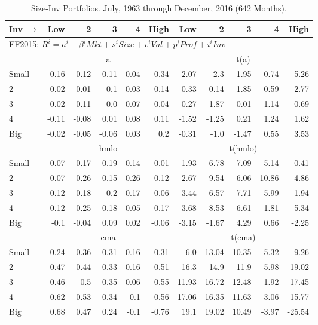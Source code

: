 
\begin{table}[!ht]
\centering
\caption{Size-Inv Portfolios. \footnotesize{July, 1963 through December, 2016 (642 Months).}}
\label{tbl:25_Size_Inv_b}
\begin{tabular}{lrrrrrrrrrr}
  \toprule
  Inv $\rightarrow$ & Low & 2 & 3 & 4 & High & Low & 2 & 3 & 4 & High \\ 
  \toprule
  \multicolumn{9}{l}{FF2015: $R^i=a^i+\beta^iMkt+s^iSize+v^iVal+p^iProf+i^iInv$} \\

      & \multicolumn{5}{c}{a} & \multicolumn{5}{c}{t(a)} \\
    \cmidrule(r){2-6} \cmidrule(r){7-11}
      Small  & 0.16  & 0.12  & 0.11  & 0.04  & -0.34   & 2.07  & 2.3  & 1.95  & 0.74  & -5.26  \\
          2  & -0.02  & -0.01  & 0.1  & 0.03  & -0.14   & -0.33  & -0.14  & 1.85  & 0.59  & -2.77  \\
          3  & 0.02  & 0.11  & -0.0  & 0.07  & -0.04   & 0.27  & 1.87  & -0.01  & 1.14  & -0.69  \\
          4  & -0.11  & -0.08  & 0.01  & 0.08  & 0.11   & -1.52  & -1.25  & 0.21  & 1.24  & 1.62  \\
      Big    & -0.02  & -0.05  & -0.06  & 0.03  & 0.2   & -0.31  & -1.0  & -1.47  & 0.55  & 3.53  \\

      & \multicolumn{5}{c}{hmlo} & \multicolumn{5}{c}{t(hmlo)} \\
    \cmidrule(r){2-6} \cmidrule(r){7-11}
      Small  & -0.07  & 0.17  & 0.19  & 0.14  & 0.01   & -1.93  & 6.78  & 7.09  & 5.14  & 0.41  \\
          2  & 0.07  & 0.26  & 0.15  & 0.26  & -0.12   & 2.67  & 9.54  & 6.06  & 10.86  & -4.86  \\
          3  & 0.12  & 0.18  & 0.2  & 0.17  & -0.06   & 3.44  & 6.57  & 7.71  & 5.99  & -1.94  \\
          4  & 0.12  & 0.25  & 0.18  & 0.05  & -0.17   & 3.68  & 8.53  & 6.61  & 1.81  & -5.34  \\
      Big    & -0.1  & -0.04  & 0.09  & 0.02  & -0.06   & -3.15  & -1.67  & 4.29  & 0.66  & -2.25  \\

      & \multicolumn{5}{c}{cma} & \multicolumn{5}{c}{t(cma)} \\
    \cmidrule(r){2-6} \cmidrule(r){7-11}
      Small  & 0.24  & 0.36  & 0.31  & 0.16  & -0.31   & 6.0  & 13.04  & 10.35  & 5.32  & -9.26  \\
          2  & 0.47  & 0.44  & 0.33  & 0.16  & -0.51   & 16.3  & 14.9  & 11.9  & 5.98  & -19.02  \\
          3  & 0.46  & 0.5  & 0.35  & 0.06  & -0.55   & 11.93  & 16.72  & 12.48  & 1.92  & -17.45  \\
          4  & 0.62  & 0.53  & 0.34  & 0.1  & -0.56   & 17.06  & 16.35  & 11.63  & 3.06  & -15.77  \\
      Big    & 0.68  & 0.47  & 0.24  & -0.1  & -0.76   & 19.1  & 19.02  & 10.49  & -3.97  & -25.54  \\


\end{tabular}
\end{table}

